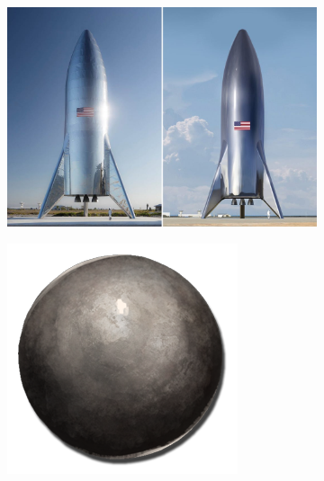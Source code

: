 \documentclass{article}
\begin{document}
\begin{figure}[h!]
  \centering
  \begin{subfigure}[b]{0.2\linewidth}
    \includegraphics[width=\linewidth]{img/rocket.jpg}
  \end{subfigure}
  \begin{subfigure}[b]{0.2\linewidth}
    \includegraphics[width=\linewidth]{img/Cannon_Ball.png}
  \end{subfigure}
\end{figure}
\end{document}
